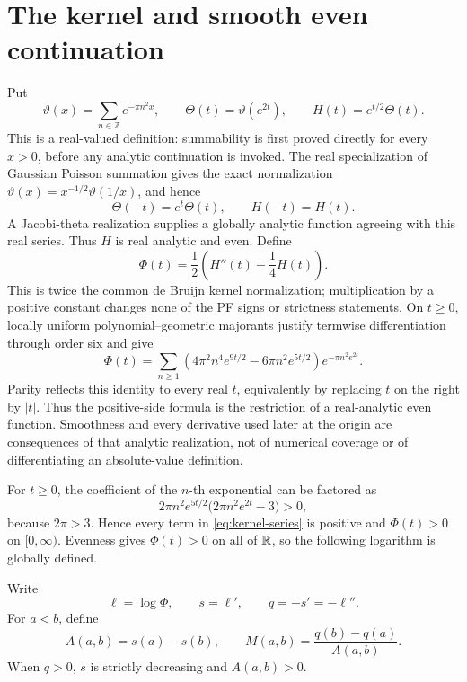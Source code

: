 \section{The kernel and smooth even continuation}\label{sec:kernel}

Put
\[
 \vartheta(x)=\sum_{n\in\mathbb Z}e^{-\pi n^2x},\qquad
 \Theta(t)=\vartheta(e^{2t}),\qquad H(t)=e^{t/2}\Theta(t).
\]
This is a real-valued definition: summability is first proved directly for
every \(x>0\), before any analytic continuation is invoked. The real
specialization of Gaussian Poisson summation gives the exact normalization
\(\vartheta(x)=x^{-1/2}\vartheta(1/x)\), and hence
\[
 \Theta(-t)=e^t\Theta(t),\qquad H(-t)=H(t).
\]
A Jacobi-theta realization supplies a globally analytic function agreeing
with this real series. Thus \(H\) is real analytic and even. Define
\[
 \Phi(t)=\frac12\left(H''(t)-\frac14H(t)\right).
\]
This is twice the common de Bruijn kernel normalization; multiplication by a
positive constant changes none of the PF signs or strictness statements.
On \(t\geq0\), locally uniform polynomial--geometric majorants justify
termwise differentiation through order six and give
\begin{equation}\label{eq:kernel-series}
 \Phi(t)=\sum_{n\geq1}
 \left(4\pi^2n^4e^{9t/2}-6\pi n^2e^{5t/2}\right)
 e^{-\pi n^2e^{2t}}.
\end{equation}
Parity reflects this identity to every real \(t\), equivalently by replacing
\(t\) on the right by \(|t|\). Thus the positive-side formula is the
restriction of a real-analytic even function. Smoothness and every derivative
used later at the origin are consequences of that analytic realization, not
of numerical coverage or of differentiating an absolute-value definition.

For \(t\geq0\), the coefficient of the \(n\)-th exponential can be factored as
\[
 2\pi n^2e^{5t/2}\bigl(2\pi n^2e^{2t}-3\bigr)>0,
\]
because \(2\pi>3\). Hence every term in \eqref{eq:kernel-series} is positive
and \(\Phi(t)>0\) on \([0,\infty)\). Evenness gives \(\Phi(t)>0\) on all of
\(\mathbb{R}\), so the following logarithm is globally defined.

Write
\[
 \ell=\log\Phi,\qquad s=\ell',\qquad q=-s'=-\ell''.
\]
For \(a<b\), define
\begin{equation}\label{eq:AM}
 A(a,b)=s(a)-s(b),\qquad
 M(a,b)=\frac{q(b)-q(a)}{A(a,b)}.
\end{equation}
When \(q>0\), \(s\) is strictly decreasing and \(A(a,b)>0\).
